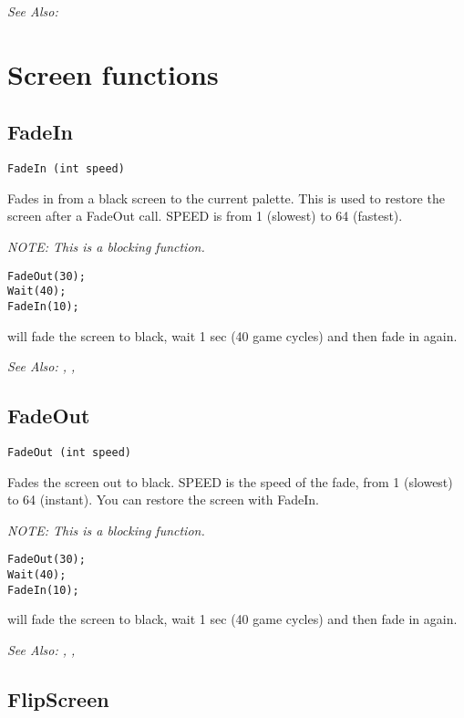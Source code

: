 \it{See Also:} 



\section{Screen functions}%


\subsection{FadeIn}\label{FadeIn}%

\begin{verbatim}
FadeIn (int speed)
\end{verbatim}
Fades in from a black screen to the current palette. This is used to restore
the screen after a FadeOut call. SPEED is from 1 (slowest) to 64 (fastest).

\it{NOTE: This is a blocking function.}

\begin{verbatim}
FadeOut(30);
Wait(40);
FadeIn(10);
\end{verbatim}
will fade the screen to black, wait 1 sec (40 game cycles) and then fade in again.

\it{See Also:} , ,


\subsection{FadeOut}\label{FadeOut}%

\begin{verbatim}
FadeOut (int speed)
\end{verbatim}
Fades the screen out to black. SPEED is the speed of the fade, from 1
(slowest) to 64 (instant). You can restore the screen with FadeIn.

\it{NOTE: This is a blocking function.}

\begin{verbatim}
FadeOut(30);
Wait(40);
FadeIn(10);
\end{verbatim}
will fade the screen to black, wait 1 sec (40 game cycles) and then fade in again.

\it{See Also:} , ,


\subsection{FlipScreen}\label{FlipScreen}%

